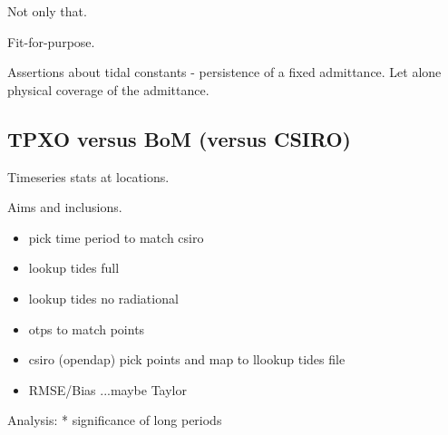 Not only that.

Fit-for-purpose.

Assertions about tidal constants - persistence of a fixed admittance.   Let alone physical coverage of the admittance.


\subsection{TPXO versus BoM (versus CSIRO)}
Timeseries stats at locations.

Aims and inclusions.
\begin{itemize}
    \item pick time period to match csiro
    \item lookup tides full
    \item lookup tides no radiational
    \item otps to match points
    \item csiro (opendap) pick points and map to llookup tides file
    \item RMSE/Bias ...maybe Taylor
\end{itemize}

Analysis:
* significance of long periods

